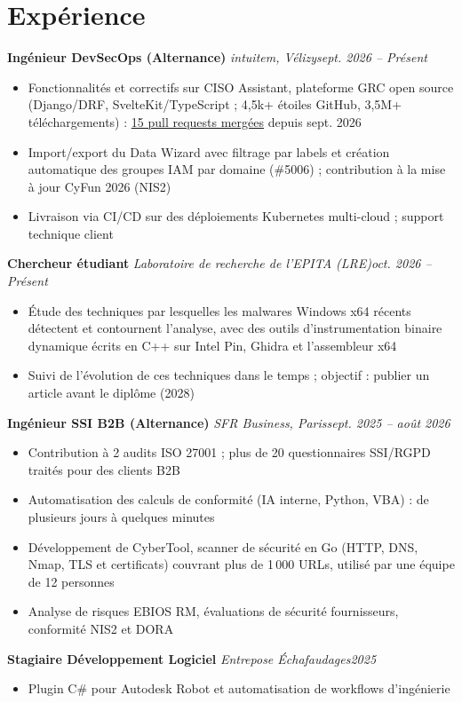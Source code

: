 \documentclass[10pt]{article}
\newcommand{\role}[4]{\textbf{#1} \textbar{} \textit{#2}\hfill\textit{#3}\par\vspace{0pt}}
\newcommand{\gap}{\vspace{4pt}}
\begin{document}
\section{Exp\'erience}
\role{Ing\'enieur DevSecOps (Alternance)}{intuitem, V\'elizy}{sept. 2026 -- Pr\'esent}{}
\begin{itemize}
\item Fonctionnalit\'es et correctifs sur CISO Assistant, plateforme GRC open source (Django/DRF, SvelteKit/TypeScript ; 4,5k+ \'etoiles GitHub, 3,5M+ t\'el\'echargements) : \href{https://github.com/intuitem/ciso-assistant-community/pulls?q=is:pr+is:merged+author:Spaghetto784}{15 pull requests merg\'ees} depuis sept. 2026
\item Import/export du Data Wizard avec filtrage par labels et cr\'eation automatique des groupes IAM par domaine (\#5006) ; contribution \`a la mise \`a jour CyFun 2026 (NIS2)
\item Livraison via CI/CD sur des d\'eploiements Kubernetes multi-cloud ; support technique client
\end{itemize}\gap
\role{Chercheur \'etudiant}{Laboratoire de recherche de l'EPITA (LRE)}{oct. 2026 -- Pr\'esent}{}
\begin{itemize}
\item \'Etude des techniques par lesquelles les malwares Windows x64 r\'ecents d\'etectent et contournent l'analyse, avec des outils d'instrumentation binaire dynamique \'ecrits en C++ sur Intel Pin, Ghidra et l'assembleur x64
\item Suivi de l'\'evolution de ces techniques dans le temps ; objectif : publier un article avant le dipl\^ome (2028)
\end{itemize}\gap
\role{Ing\'enieur SSI B2B (Alternance)}{SFR Business, Paris}{sept. 2025 -- ao\^ut 2026}{}
\begin{itemize}
\item Contribution \`a 2 audits ISO 27001 ; plus de 20 questionnaires SSI/RGPD trait\'es pour des clients B2B
\item Automatisation des calculs de conformit\'e (IA interne, Python, VBA) : de plusieurs jours \`a quelques minutes
\item D\'eveloppement de CyberTool, scanner de s\'ecurit\'e en Go (HTTP, DNS, Nmap, TLS et certificats) couvrant plus de 1\,000 URLs, utilis\'e par une \'equipe de 12 personnes
\item Analyse de risques EBIOS RM, \'evaluations de s\'ecurit\'e fournisseurs, conformit\'e NIS2 et DORA
\end{itemize}\gap
\role{Stagiaire D\'eveloppement Logiciel}{Entrepose \'Echafaudages}{2025}{}
\begin{itemize}\item Plugin C\# pour Autodesk Robot et automatisation de workflows d'ing\'enierie\end{itemize}
\end{document}
